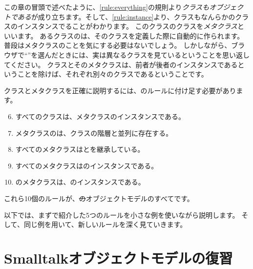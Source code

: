 \documentclass[a4paper,10pt,twoside]{book}
\begin{document}
この章の冒頭で述べたように、\ref{rule:everything}の規則より\emph{クラスもオブジェクトである}が成り立ちます。そして、\ref{rule:instance}より、クラスもなんらかのクラスのインスタンスでることがわかります。
このクラスのクラスを\emph{メタクラス}といいます。
あるクラスのは、そのクラスを定義した際に自動的に作られます。
普段はメタクラスのことを気にする必要はないでしょう。
しかしながら、ブラウザで``''を選んだときには、実は異なるクラスを見ているということを思い返してください。
クラスとそのメタクラスは、前者が後者のインスタンスであるということを除けば、それぞれ別々のクラスであるということです。

クラスとメタクラスを正確に説明するには、のルールに付け足す必要があります。

\begin{enumerate}[label={\textbf{Rule \arabic{*}}.}, ref={Rule \arabic{*}}, leftmargin=*, widest=10]
\setcounter{enumi}{5}
\item{} 
	すべてのクラスは、メタクラスのインスタンスである。

\item{} 
	メタクラスのは、クラスの階層と並列に存在する。

\item{} 
	すべてのメタクラスはとを継承している。

\item{} 
	すべてのメタクラスはのインスタンスである。

\item{} 
	のメタクラスは、のインスタンスである。

\end{enumerate}

\noindent
これら10個のルールが、\st のオブジェクトモデルのすべてです。

以下では、まずで紹介した5つのルールを小さな例を使いながら説明します。
そして、同じ例を用いて、新しいルールを深く見ていきます。

\section{Smalltalkオブジェクトモデルの復習}
\end{document}
